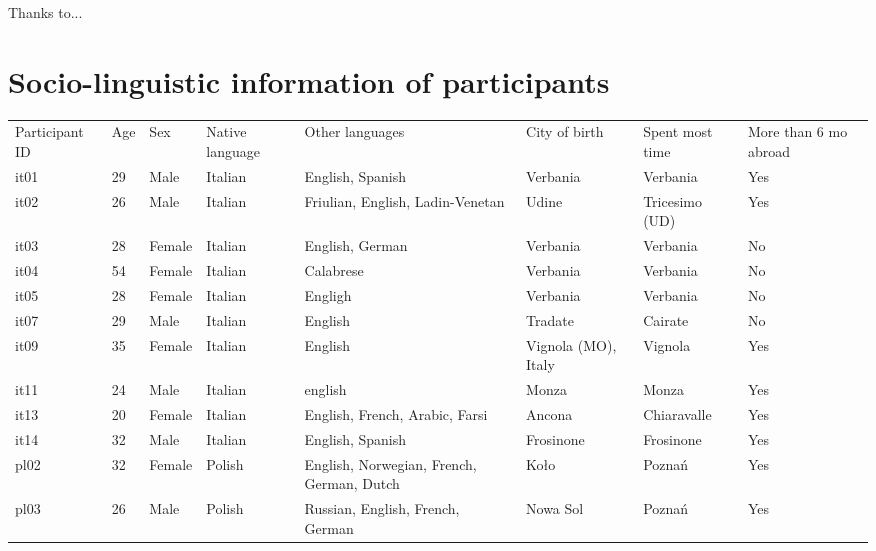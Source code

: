 \documentclass[]{JASAnew}
\begin{document}
\begin{acknowledgments}
Thanks to...
\end{acknowledgments}

\appendix

\section{Socio-linguistic information of participants}
\label{a:socioling}

\begin{table}[]
\begin{tabular}{llllllll}
Participant ID & Age & Sex    & Native language & Other languages & City of birth & Spent most time & More than 6 mo abroad \\
it01 & 29 & Male   & Italian & English, Spanish                          & Verbania            & Verbania        & Yes \\
it02 & 26 & Male   & Italian & Friulian, English, Ladin-Venetan          & Udine               & Tricesimo (UD)  & Yes \\
it03 & 28 & Female & Italian & English, German                           & Verbania            & Verbania        & No  \\
it04 & 54 & Female & Italian & Calabrese                                 & Verbania            & Verbania        & No  \\
it05 & 28 & Female & Italian & Engligh                                   & Verbania            & Verbania        & No  \\
it07 & 29 & Male   & Italian & English                                   & Tradate             & Cairate         & No  \\
it09 & 35 & Female & Italian & English                                   & Vignola (MO), Italy & Vignola         & Yes \\
it11 & 24 & Male   & Italian & english                                   & Monza               & Monza           & Yes \\
it13 & 20 & Female & Italian & English, French, Arabic, Farsi            & Ancona              & Chiaravalle     & Yes \\
it14 & 32 & Male & Italian & English, Spanish & Frosinone & Frosinone & Yes \\
pl02 & 32 & Female & Polish  & English, Norwegian, French, German, Dutch & Koło                & Poznań          & Yes \\
pl03 & 26 & Male   & Polish  & Russian, English, French, German          & Nowa Sol            & Poznań          & Yes \\

\end{tabular}
\end{table}
\end{document}
